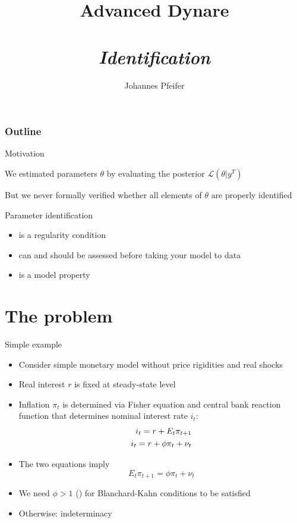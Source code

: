 \documentclass[handout,usepdftitle=false,xcolor=dvipsnames,aspectratio=169]{beamer}
\title[]{\textbf{Advanced Dynare\\}
\medskip{Chapter VII}\\
\emph{Identification}
}
\author{Johannes Pfeifer}
\begin{document}
\maketitle
%
\begin{frame}
  \frametitle{Outline}
  \tableofcontents%
\end{frame}


\begin{frame}{Motivation}
  \begin{witemize}
    \item We estimated parameters $\theta$  by evaluating the posterior $\mathcal{L}(\theta|y^T)$
    \item But we never formally verified whether all elements of $\theta$ are properly identified
    \item Parameter identification
    \begin{itemize}
      \item is a regularity condition
      \item can and should be assessed before taking your model to data
      \item is a model property
    \end{itemize}
  \end{witemize}

\end{frame}

\section{The problem}
\renewcommand{\Source}{\textcite{Cochrane2011}}
\begin{frame}{Simple example}
  \begin{itemize}
    \item Consider simple monetary model without price rigidities and real shocks
    \item Real interest $r$ is fixed at steady-state level
    \item Inflation $\pi_t$ is determined via Fisher equation and central bank reaction function that determines nominal interest rate $i_t$:
          \begin{align}
            {i_t} = r + {E_t}{\pi _{t + 1}} \hfill \\
            {i_t} = r + \phi {\pi _t} + {\nu _t} \label{eq:Taylorrule}
          \end{align}
    \item The two equations imply
          \begin{equation}
            {E_t}{\pi _{t + 1}} = \phi {\pi _t} + {\nu _t} \label{eq:cochraneFOC}
          \end{equation}
    \item We need $ \phi>1$ () for Blanchard-Kahn conditions to be satisfied
    \item Otherwise: indeterminacy
  \end{itemize}
\end{frame}
\end{document}

